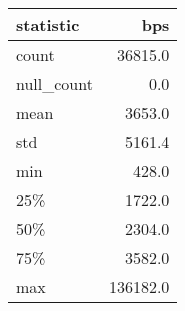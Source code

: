 \begin{tabular}{lr}
    \toprule
    statistic & bps \\
    \midrule
    count & 36815.0 \\
    null\_count & 0.0 \\
    mean & 3653.0 \\
    std & 5161.4 \\
    min & 428.0 \\
    25\% & 1722.0 \\
    50\% & 2304.0 \\
    75\% & 3582.0 \\
    max & 136182.0 \\
    \bottomrule
\end{tabular}
